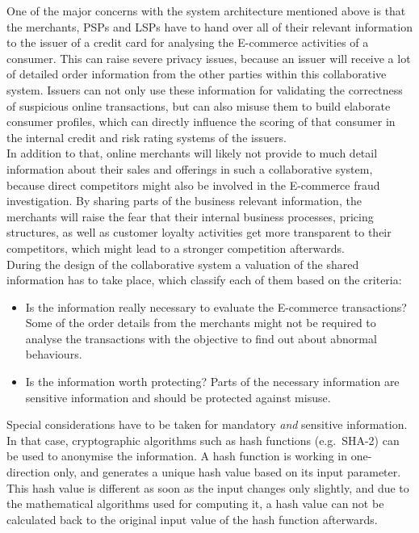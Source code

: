 One of the major concerns with the system architecture mentioned above is that the merchants, \gls{PSP}s and \gls{LSP}s have to hand over all of their relevant information to the issuer of a credit card for analysing the \gls{E-commerce} activities of a consumer. This can raise severe privacy issues, because an issuer will receive a lot of detailed order information from the other parties within this collaborative system. Issuers can not only use these information for validating the correctness of suspicious online transactions, but can also misuse them to build elaborate consumer profiles, which can directly influence the scoring of that consumer in the internal credit and risk rating systems of the issuers. \\

In addition to that, online merchants will likely not provide to much detail information about their sales and offerings in such a collaborative system, because direct competitors might also be involved in the \gls{E-commerce} fraud investigation. By sharing parts of the business relevant information, the merchants will raise the fear that their internal business processes, pricing structures, as well as customer loyalty activities get more transparent to their competitors, which might lead to a stronger competition afterwards. \\

During the design of the collaborative system a valuation of the shared information has to take place, which classify each of them based on the criteria: \@

\begin{itemize}
	\item Is the information really necessary to evaluate the \gls{E-commerce} transactions? Some of the order details from the merchants might not be required to analyse the transactions with the objective to find out about abnormal behaviours.
	\item Is the information worth protecting? Parts of the necessary information are sensitive information and should be protected against misuse.
\end{itemize}

Special considerations have to be taken for mandatory \emph{and} sensitive information. In that case, cryptographic algorithms such as hash functions (e.g.\ \gls{SHA-2}) can be used to anonymise the information. A hash function is working in one-direction only, and generates a unique hash value based on its input parameter. This hash value is different as soon as the input changes only slightly, and due to the mathematical algorithms used for computing it, a hash value can not be calculated back to the original input value of the hash function afterwards. \\

